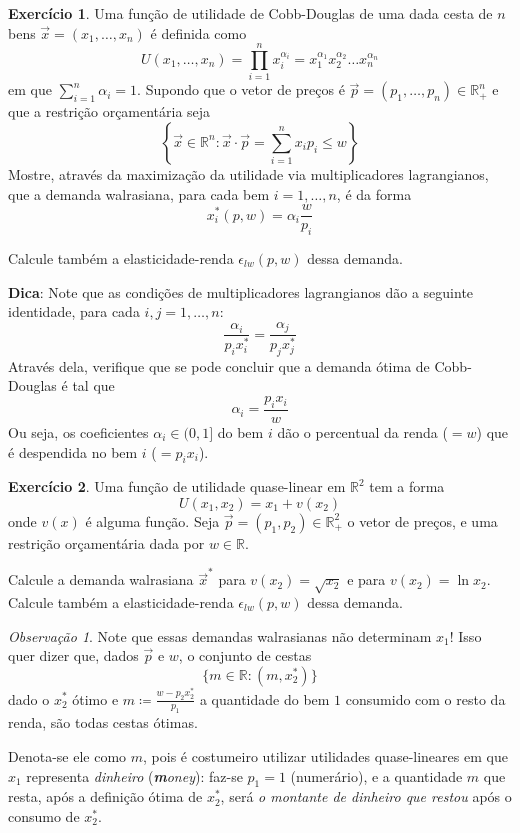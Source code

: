 \documentclass[12pt]{article}
\numberwithin{equation}{section}
\theoremstyle{plain}
\theoremstyle{definition}
\newtheorem{exercise}{Exercício}
\theoremstyle{remark}
\newtheorem*{remark}{Observação}
\begin{document}
\begin{exercise}
    Uma função de utilidade de Cobb-Douglas de uma
    dada cesta de \(n\) bens \(\vec{x}=(x_{1},\dots,x_{n})\) é definida como
    \[
    U(x_{1},\dots,x_{n}) = \prod\limits_{i=1}^{n} x_{i}^{\alpha_{i}} = x_{1}^{\alpha_{1}}x_{2}^{\alpha_{2}}\dots x_{n}^{\alpha_{n}}
    \] em que \(\sum\limits_{i=1}^{n} \alpha_{i} = 1\). Supondo que o vetor
    de preços é \(\vec{p}=(p_{1},\dots,p_{n}) \in \mathbb{R}^{n}_{+}\) e que
    a restrição orçamentária seja \[
    \left\{  \vec{x} \in \mathbb{R}^n : \vec{x} \cdot \vec{p} = \sum \limits_{i=1}^{n} x_{i}p_{i} \leq w  \right\}
    \]Mostre, através da maximização da utilidade via multiplicadores lagrangianos, que a
    demanda walrasiana, para cada bem \(i = 1, \dots, n\), é da forma \[
    x^*_{i}(p,w) = \alpha_{i} \frac{w}{p_{i}}
    \]
    
    Calcule também a elasticidade-renda \(\epsilon_{lw}(p,w)\) dessa
    demanda.

    \textbf{Dica}: Note que as condições de multiplicadores lagrangianos dão
    a seguinte identidade, para cada \(i,j = 1, \dots, n\): 
    \[
    \frac{\alpha_{i}}{p_{i} x^*_{i}} = \frac{\alpha_{j}}{p_{j} x^*_{j}}
    \] 
    Através dela, verifique que se pode concluir que a demanda ótima de
    Cobb-Douglas é tal que \[
    \alpha_{i} = \frac{p_{i}x_{i}}{w}
    \] Ou seja, os coeficientes \(\alpha_{i} \in (0, 1]\) do bem \(i\) dão o percentual
    da renda (\(=w\)) que é despendida no bem \(i\) (\(=p_{i}x_{i}\)).
    
\end{exercise}

\begin{exercise}
    Uma função de utilidade quase-linear em
    \(\mathbb{R}^{2}\) tem a forma \[
    U(x_{1},x_{2}) = x_{1} + v(x_{2})
    \] onde \(v(x)\) é alguma função. Seja
    \(\vec{p}=(p_{1},p_{2}) \in \mathbb{R}^{2}_{+}\) o vetor de preços, e
    uma restrição orçamentária dada por \(w \in \mathbb{R}\).
    
    Calcule a demanda walrasiana \(\vec{x}^*\) para
    \(v(x_{2}) = \sqrt{ x_{2} }\) e para \(v(x_{2}) = \ln x_{2}\). Calcule também a elasticidade-renda \(\epsilon_{lw}(p,w)\) dessa demanda.

    \begin{remark}
        Note que essas demandas walrasianas não determinam \(x_{1}\)! Isso quer
        dizer que, dados \(\vec{p}\) e \(w\), o conjunto de cestas 
        \[
        \{ m \in \mathbb{R}: (m,x_{2}^*) \}
        \] 
        dado o \(x_{2}^*\) ótimo e $m \coloneq \frac{w - p_2 x_2^*}{p_1}$ a quantidade do bem $1$ consumido com o resto da renda, são todas cestas ótimas.
        
        Denota-se ele como $m$, pois é costumeiro utilizar utilidades quase-lineares em que $x_1$ representa \textit{dinheiro} (\textit{\textbf{m}oney}): faz-se $p_1=1$ (numerário), e a quantidade $m$ que resta, após a definição ótima de $x_2^*$, será \textit{o montante de dinheiro que restou} após o consumo de $x_2^*$.
    \end{remark}

\end{exercise}
\end{document}
